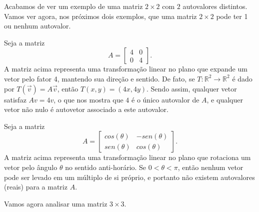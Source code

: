 Acabamos de ver um exemplo de uma matriz $2 \times 2$ com $2$ autovalores distintos. Vamos ver agora, nos próximos dois exemplos, que uma matriz $2\times 2$ pode ter 1 ou nenhum autovalor.

\begin{ex}
	Seja  a matriz
	\begin{equation}
	A={\begin{bmatrix}4&0\\0&4\end{bmatrix}}.
	\end{equation}
	A matriz acima representa uma transformação linear no plano que expande um vetor pelo fator 4, mantendo sua direção e sentido. De fato, se $T:\mathbb{R}^2 \rightarrow \mathbb{R}^2$ é dado por $T(\vec{v})=A \vec{v}$, então $T(x,y)=(4x,4y)$.
    Sendo assim, qualquer vetor satisfaz $Av = 4v$, o que nos mostra que $4$ é o único autovalor de $A$, e qualquer vetor não nulo é autovetor associado a este autovalor.
\end{ex}


\begin{ex}
	Seja  a matriz
	\begin{equation}
	A={\begin{bmatrix}cos(\theta)&-sen(\theta)\\sen(\theta)&cos(\theta)\end{bmatrix}}.
	\end{equation}
	A matriz acima representa uma transformação linear no plano que rotaciona um vetor pelo ângulo $\theta$ no sentido anti-horário.
	Se $0<\theta<\pi$, então nenhum vetor pode ser levado em um múltiplo de si próprio, e portanto não existem autovalores (reais) para a matriz $A$. 
\end{ex}

Vamos agora analisar uma matriz $3\times 3$.

